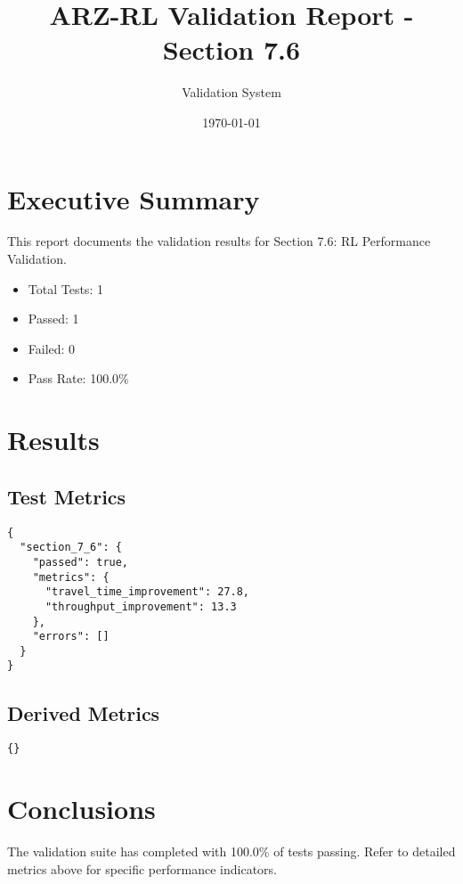 \documentclass[12pt,a4paper]{article}
\title{ARZ-RL Validation Report - Section 7.6}
\author{Validation System}
\date{\today}
\begin{document}
\maketitle

\section{Executive Summary}

This report documents the validation results for Section 7.6: RL Performance Validation.

\begin{itemize}
    \item Total Tests: 1
    \item Passed: 1
    \item Failed: 0
    \item Pass Rate: 100.0\%
\end{itemize}

\section{Results}

\subsection{Test Metrics}

\begin{verbatim}
{
  "section_7_6": {
    "passed": true,
    "metrics": {
      "travel_time_improvement": 27.8,
      "throughput_improvement": 13.3
    },
    "errors": []
  }
}
\end{verbatim}

\subsection{Derived Metrics}

\begin{verbatim}
{}
\end{verbatim}

\section{Conclusions}

The validation suite has completed with 100.0\% of tests passing.
Refer to detailed metrics above for specific performance indicators.
\end{document}
